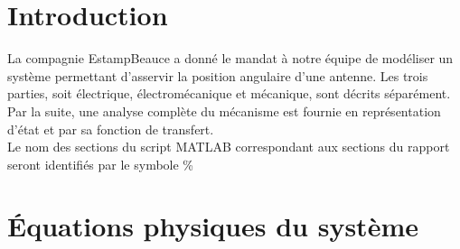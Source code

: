 \documentclass{udes_rapport} %
\begin{document}




\newpage

\tableofcontents
\newpage


\listoffigures
\newpage



\setcounter{page}{1} %
\section{Introduction}
La compagnie EstampBeauce a donné le mandat à notre équipe de modéliser un système permettant d'asservir la 
position angulaire d'une antenne. Les trois parties, soit électrique, électromécanique et mécanique, sont décrits séparément. 
Par la suite, une analyse complète du mécanisme est fournie en représentation d'état et par sa fonction de transfert. \\Le nom des sections du script MATLAB correspondant aux sections du rapport seront identifiés par le symbole \%

\section{Équations physiques du système}
\end{document}
